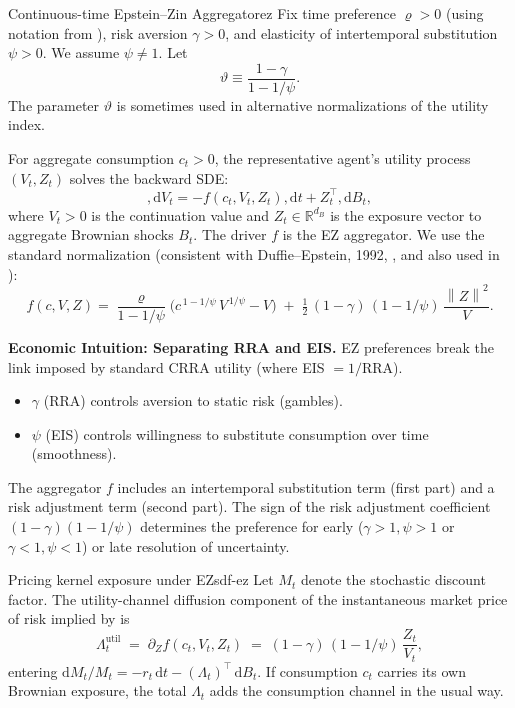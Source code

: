 ﻿\documentclass[11pt,letterpaper,oneside]{article}
\numberwithin{equation}{section}
\newcommand{\1}{\mathbf{1}}
\newcommand{\diff}{,\mathrm{d}}
\newcommand{\norm}[1]{\left\lVert #1\right\rVert}
\begin{document}
\begin{definition}{Continuous-time Epstein--Zin Aggregator}{ez}
Fix time preference $\varrho>0$ (using notation from ), risk aversion $\gamma>0$, and elasticity of intertemporal substitution $\psi>0$. We assume $\psi\neq 1$. Let
\[
\vartheta \equiv \frac{1-\gamma}{1-1/\psi}.
\]
The parameter $\vartheta$ is sometimes used in alternative normalizations of the utility index.

For aggregate consumption $c_t>0$, the representative agent's utility process $(V_t, Z_t)$ solves the backward SDE:
\[
\diff V_t = -f(c_t, V_t, Z_t)\diff t + Z_t^\top \diff B_t,
\]
where $V_t>0$ is the continuation value and $Z_t\in\mathbb{R}^{d_B}$ is the exposure vector to aggregate Brownian shocks $B_t$. The driver $f$ is the EZ aggregator. We use the standard normalization (consistent with Duffie--Epstein, 1992, \cite{duffie_epstein_1992}, and also used in \cite{Sauzet2023}):
\begin{equation}\label{eq:ez-agg}
f(c,V,Z)
= \frac{\varrho}{1-1/\psi}\Big( c^{\,1-1/\psi}\,V^{\,1/\psi} - V \Big)
\; +\; \tfrac{1}{2}\,(1-\gamma)\,(1-1/\psi)\,\frac{\norm{Z}^2}{V}.
\end{equation}
\end{definition}

\begin{tcolorbox}[didacticstyle]
\textbf{Economic Intuition: Separating RRA and EIS.}
EZ preferences break the link imposed by standard CRRA utility (where EIS $= 1/\text{RRA}$).
\begin{itemize}[leftmargin=1.15em,itemsep=0.25em]
 \item $\gamma$ (RRA) controls aversion to static risk (gambles).
 \item $\psi$ (EIS) controls willingness to substitute consumption over time (smoothness).
\end{itemize}
The aggregator $f$ includes an intertemporal substitution term (first part) and a risk adjustment term (second part). The sign of the risk adjustment coefficient $(1-\gamma)(1-1/\psi)$ determines the preference for early ($\gamma>1, \psi>1$ or $\gamma<1, \psi<1$) or late resolution of uncertainty.
\end{tcolorbox}

\begin{proposition}{Pricing kernel exposure under EZ}{sdf-ez}
Let $M_t$ denote the stochastic discount factor. The utility-channel diffusion
component of the instantaneous market price of risk implied by
 is
\[
\Lambda^{\mathrm{util}}_t \;=\; \partial_Z f(c_t, V_t, Z_t) \;=\; (1-\gamma)\,(1-1/\psi)\,\frac{Z_t}{V_t},
\]
entering $\mathrm{d}M_t/M_t = -r_t\,\mathrm{d}t - (\Lambda_t)^{\!\top}\,\mathrm{d}B_t$.
If consumption $c_t$ carries its own Brownian exposure, the total $\Lambda_t$ adds
the consumption channel in the usual way.
\end{proposition}
\end{document}
